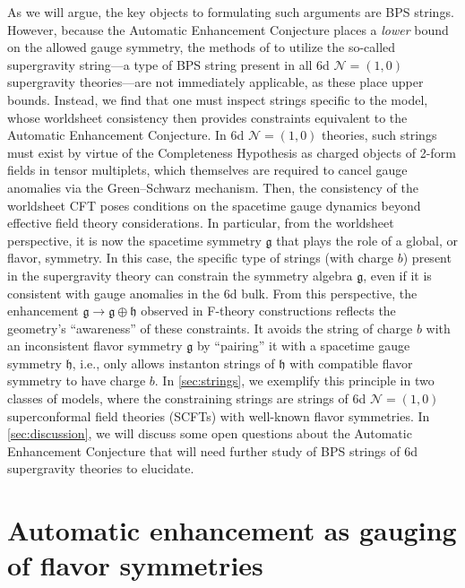 \documentclass[11pt, a4paper]{article}
\newcommand*{\cN}{\ensuremath{\mathcal{N}}}
\newcommand*{\fkg}{\ensuremath{\mathfrak{g}}}
\newcommand*{\fkh}{\ensuremath{\mathfrak{h}}}
\begin{document}
As we will argue, the key objects to formulating such arguments are BPS strings.
However, because the Automatic Enhancement Conjecture places a \emph{lower} bound on the allowed gauge symmetry, the methods of \cite{Kim:2019vuc,Lee:2019skh,Cheng:2021zjh} to utilize the so-called supergravity string---a type of BPS string present in all 6d $\cN=(1,0)$ supergravity theories---are not immediately applicable, as these place upper bounds.
Instead, we find that one must inspect strings specific to the model, whose worldsheet consistency then provides constraints equivalent to the Automatic Enhancement Conjecture.
In 6d $\cN = (1, 0)$ theories, such strings must exist by virtue of the Completeness Hypothesis \cite{Polchinski:2003bq} as charged objects of 2-form fields in tensor multiplets, which themselves are required to cancel gauge anomalies via the Green--Schwarz mechanism.
Then, the consistency of the worldsheet CFT poses conditions on the spacetime gauge dynamics beyond effective field theory considerations.
In particular, from the worldsheet perspective, it is now the spacetime symmetry $\fkg$ that plays the role of a global, or flavor, symmetry.
In this case, the specific type of strings (with charge $b$) present in the supergravity theory can constrain the symmetry algebra $\fkg$, even if it is consistent with gauge anomalies in the 6d bulk.
From this perspective, the enhancement $\fkg \to \fkg \oplus \fkh$ observed in F-theory constructions reflects the geometry's ``awareness'' of these constraints.
It avoids the string of charge $b$ with an inconsistent flavor symmetry $\fkg$ by ``pairing'' it with a spacetime gauge symmetry $\fkh$, i.e., only allows instanton strings of $\fkh$ with compatible flavor symmetry to have charge $b$.
In \cref{sec:strings}, we exemplify this principle in two classes of models, where the constraining strings are strings of 6d $\cN = (1, 0)$ superconformal field theories (SCFTs) with well-known flavor symmetries.
In \cref{sec:discussion}, we will discuss some open questions about the Automatic Enhancement Conjecture that will need further study of BPS strings of 6d supergravity theories to elucidate.










\section{Automatic enhancement as gauging of flavor symmetries}
\label{sec:flavor_anomalies}
\end{document}

